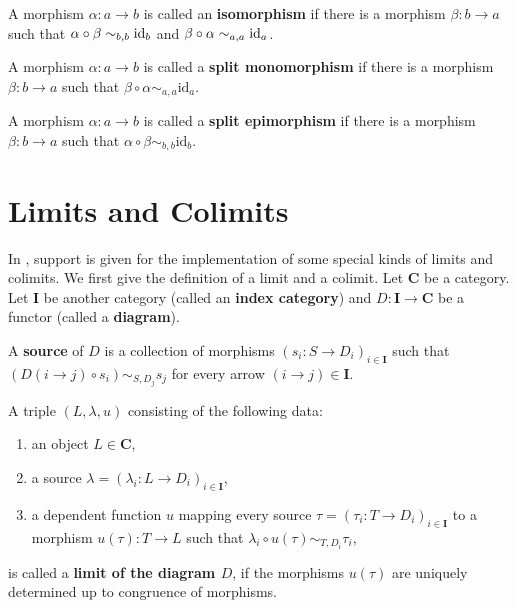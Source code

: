 \begin{definition}
 A morphism $\alpha: a \rightarrow b$ is called an \textbf{isomorphism} if there is a morphism $\beta: b \rightarrow a$
 such that $\alpha \circ \beta \sim_{b,b} \mathrm{id}_{b}$ and $\beta \circ \alpha \sim_{a,a} \mathrm{id}_{a}$.
\end{definition}

\begin{definition}
 A morphism $\alpha: a \rightarrow b$ is called a \textbf{split monomorphism} if there is a morphism $\beta: b \rightarrow a$
 such that $\beta \circ \alpha \sim_{a,a} \mathrm{id}_{a}$.
\end{definition}

\begin{definition}
 A morphism $\alpha: a \rightarrow b$ is called a \textbf{split epimorphism} if there is a morphism $\beta: b \rightarrow a$
 such that $\alpha \circ \beta \sim_{b,b} \mathrm{id}_{b}$.
\end{definition}



\section{Limits and Colimits}\label{section:universalobjects}

In \CapPkg, support is given for the implementation of some special kinds of limits and
colimits. We first give the definition of a limit and a colimit.
Let $\mathbf{C}$ be a category. Let $\mathbf{I}$ be another category (called an \textbf{index category}) and $D: \mathbf{I} \rightarrow \mathbf{C}$
be a functor (called a \textbf{diagram}). 
\begin{definition} 
 A \textbf{source} of $D$ is a collection of morphisms $( s_i: S \rightarrow D_i)_{i \in \mathbf{I}}$ such that
 $\left( D( i \rightarrow j ) \circ s_i \right) \sim_{S,D_j} s_j$ for every arrow $(i \rightarrow j) \in \mathbf{I}$.
\end{definition}
 
\begin{definition}
 A triple $(L, \lambda, u)$ consisting of the following data:
 \begin{enumerate}
  \item an object $L \in \mathbf{C}$,
  \item a source $\lambda = ( \lambda_i: L \rightarrow D_i)_{i \in \mathbf{I}}$,
  \item a dependent function $u$ mapping every source $\tau = ( \tau_i: T \rightarrow D_i )_{i \in \mathbf{I}}$
        to a morphism $u( \tau ): T \rightarrow L$ such that
        $\lambda_i \circ u( \tau ) \sim_{T,D_i} \tau_i$,
 \end{enumerate}
 is called a \textbf{limit of the diagram $D$}, if the morphisms $u(\tau)$ are uniquely determined up to
 congruence of morphisms.
\end{definition}

